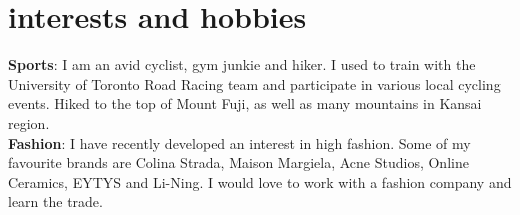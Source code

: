 \documentclass[]{cv-roald}
\begin{document}
\section*{interests and hobbies}
\textbf{Sports}: I am an avid cyclist, gym junkie and hiker. I used to train with the University of Toronto Road Racing team and participate in various local cycling events. Hiked to the top of Mount Fuji, as well as many mountains in Kansai region. \\
\textbf{Fashion}: I have recently developed an interest in high fashion. Some of my favourite brands are Colina Strada, Maison Margiela, Acne Studios, Online Ceramics, EYTYS and Li-Ning. I would love to work with a fashion company and learn the trade.
\end{document}
